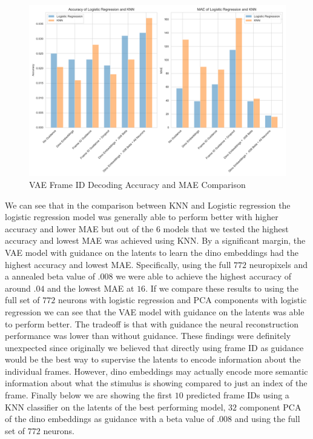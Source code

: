 \documentclass[12pt, letterpaper]{article}
\begin{document}
\begin{figure}[H]
    \centering
    \includegraphics[width=1.0\textwidth]{vae_models_logistic_knn_comparison.png}
    \caption{VAE Frame ID Decoding Accuracy and MAE Comparison}
    \label{fig:vae_frame_id_decoding_comparison}
\end{figure}

We can see that in the comparison between KNN and Logistic regression the logistic regression model was generally able to perform better with higher accuracy and lower MAE but out of the $6$ models that we tested the highest accuracy and lowest MAE was achieved using KNN. By a significant margin, the VAE model with guidance on the latents to learn the dino embeddings had the highest accuracy and lowest MAE. Specifically, using the full $772$ neuropixels and a annealed beta value of $.008$ we were able to achieve the highest accuracy of around $.04$ and the lowest MAE at $16$. If we compare these results to using the full set of $772$ neurons with logistic regression and PCA components with logistic regression we can see that the VAE model with guidance on the latents was able to perform better. The tradeoff is that with guidance the neural reconstruction performance was lower than without guidance. These findings were definitely unexpected since originally we believed that directly using frame ID as guidance would be the best way to supervise the latents to encode information about the individual frames. However, dino embeddings may actually encode more semantic information about what the stimulus is showing compared to just an index of the frame. Finally below we are showing the first $10$ predicted frame IDs using a KNN classifier on the latents of the best performing model, $32$ component PCA of the dino embeddings as guidance with a beta value of $.008$ and using the full set of $772$ neurons.
\end{document}
